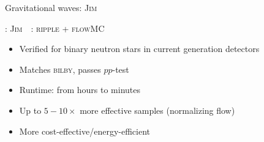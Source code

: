 \documentclass[usenames,dvipsnames,t]{beamer}
\newcommand{\ghlink}[1]{\href{https://github.com/#1}{\textcolor{black}{\faGithub}}}
\begin{document}
\begin{frame}{Gravitational waves: \textsc{Jim}}

  \def\x{3mm}
  \def\y{5mm}
  \def\z{1mm}

  : \textsc{Jim}~\ghlink{kazewong/jim}~\cite{Wong:2023lgb,Wouters:2024oxj}: \textsc{ripple} + \textsc{flowMC}

  \begin{itemize}
    
    \item Verified for binary neutron stars in current generation detectors~\cite{Wouters:2024oxj}

    \vspace{\z}

    \item Matches \textsc{bilby}, passes $pp$-test

    \vspace{\z}

    \item<2-> Runtime: from hours to minutes

    \vspace{\z}

    \item<3-> Up to $5 - 10 \times$ more effective samples (normalizing flow)

    \vspace{\z}
    
    \item<4-> More cost-effective/energy-efficient
  \end{itemize}


  \vspace{\x}



\end{frame}
\end{document}
